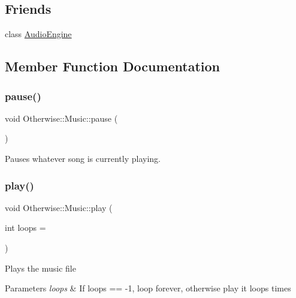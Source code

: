 \subsection*{Friends}
\begin{DoxyCompactItemize}
\item 
class \hyperlink{class_otherwise_1_1_music_a234a96133b0b1dbaf4181626861f7c4a}{Audio\+Engine}
\end{DoxyCompactItemize}


\subsection{Member Function Documentation}
\mbox{\label{class_otherwise_1_1_music_a95dfdf673ae0906c60cc5dee2047154c}} 
\subsubsection{\texorpdfstring{pause()}{pause()}}
{\footnotesize\ttfamily void Otherwise\+::\+Music\+::pause (\begin{DoxyParamCaption}{ }\end{DoxyParamCaption})\hspace{0.3cm}{\ttfamily [static]}}



Pauses whatever song is currently playing. 

\mbox{\label{class_otherwise_1_1_music_a18aef6a70fa7bc14c92b17792a148828}} 
\subsubsection{\texorpdfstring{play()}{play()}}
{\footnotesize\ttfamily void Otherwise\+::\+Music\+::play (\begin{DoxyParamCaption}\item[{int}]{loops = {} }\end{DoxyParamCaption})}

Plays the music file 
\begin{DoxyParams}{Parameters}
{\em loops} & If loops == -\/1, loop forever, otherwise play it loops times \\
\hline
\end{DoxyParams}
\mbox{\label{class_otherwise_1_1_music_a6d4a1afb589d1e03a92bc89f1be520b9}} 
